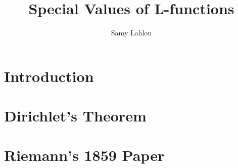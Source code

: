 \documentclass{article}
\title{Special Values of L-functions}
\author{Samy Lahlou}
\date{}
\theoremstyle{plain}
\theoremstyle{definition}
\begin{document}
\maketitle


\tableofcontents

\newpage

\section{Introduction}

\section{Dirichlet's Theorem}

\section{Riemann's 1859 Paper}
\end{document}
